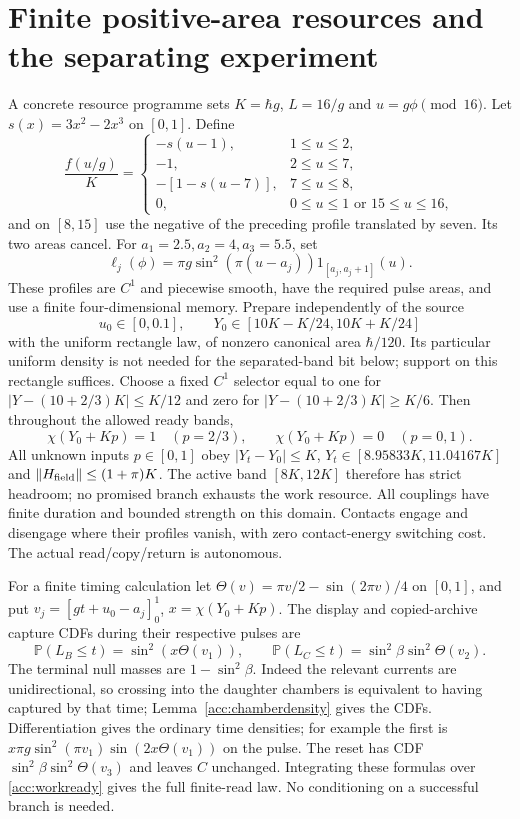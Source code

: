 \documentclass[11pt,oneside,openany]{book}
\theoremstyle{definition}
\theoremstyle{remark}\newtheorem{remark}[theorem]{Remark}
\begin{document}
\section{Finite positive-area resources and the separating experiment}
A concrete resource programme sets $K=\hbar g$, $L=16/g$ and
$u=g\phi\pmod{16}$. Let $s(x)=3x^2-2x^3$ on $[0,1]$. Define
\[
 \frac{f(u/g)}K=
 \begin{cases}
 -s(u-1),&1\le u\le2,\\
 -1,&2\le u\le7,\\
 -[1-s(u-7)],&7\le u\le8,\\
 0,&0\le u\le1\text{ or }15\le u\le16,
 \end{cases}
\]
and on $[8,15]$ use the negative of the preceding profile translated by
seven. Its two areas cancel. For $a_1=2.5,a_2=4,a_3=5.5$, set
\[
 \ell_j(\phi)=\pi g\sin^2(\pi(u-a_j))1_{[a_j,a_j+1]}(u).
\]
These profiles are $C^1$ and piecewise smooth, have the required pulse
areas, and use a finite four-dimensional memory.
Prepare independently of the source
\begin{equation}
 u_0\in[0,0.1],\qquad
 Y_0\in[10K-K/24,10K+K/24]
 \label{acc:workready}
\end{equation}
with the uniform rectangle law, of nonzero canonical area $\hbar/120$.
Its particular uniform density is not needed for the separated-band bit
below; support on this rectangle suffices.
Choose a fixed $C^1$ selector equal to one for
$|Y-(10+2/3)K|\le K/12$ and zero for
$|Y-(10+2/3)K|\ge K/6$. Then throughout the allowed ready bands,
\[
 \chi(Y_0+Kp)=1\quad(p=2/3),\qquad
 \chi(Y_0+Kp)=0\quad(p=0,1).
\]
All unknown inputs $p\in[0,1]$ obey $|Y_t-Y_0|\le K$,
$Y_t\in[8.95833K,11.04167K]$ and
$\|H_{
\rm field}\|\le(1+\pi)K$. The active band $[8K,12K]$ therefore has
strict headroom; no promised branch exhausts the work resource.
All couplings have finite duration and bounded strength on this domain.
Contacts engage and disengage where their profiles vanish, with zero
contact-energy switching cost. The actual read/copy/return is autonomous.

For a finite timing calculation let
$\Theta(v)=\pi v/2-\sin(2\pi v)/4$ on $[0,1]$, and put
$v_j=[gt+u_0-a_j]_0^1$, $x=\chi(Y_0+Kp)$.
The display and copied-archive capture CDFs during their respective pulses
are
\begin{equation}
 \mathbb P(L_B\le t)=\sin^2(x\Theta(v_1)),\qquad
 \mathbb P(L_C\le t)=\sin^2\beta\sin^2\Theta(v_2).
 \label{acc:rotortimes}
\end{equation}
The terminal null masses are $1-\sin^2\beta$.
Indeed the relevant currents are unidirectional, so crossing into the
daughter chambers is equivalent to having captured by that time;
Lemma~\ref{acc:chamberdensity} gives the CDFs. Differentiation gives the
ordinary time densities; for example the first is
$x\pi g\sin^2(\pi v_1)\sin(2x\Theta(v_1))$ on the pulse.
The reset has CDF $\sin^2\beta\sin^2\Theta(v_3)$ and leaves $C$
unchanged. Integrating these formulas over \eqref{acc:workready} gives
the full finite-read law. No conditioning on a successful branch is needed.
\end{document}
